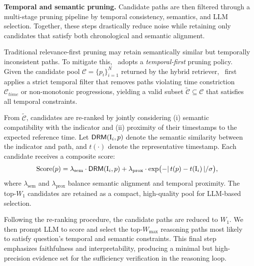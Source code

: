 \noindent
\textbf{Temporal and semantic pruning.}
Candidate paths are then filtered through a multi-stage pruning pipeline by temporal consistency, semantics, and LLM selection.
Together, these steps drastically reduce noise while retaining only candidates that satisfy both chronological and semantic alignment.

Traditional relevance-first pruning may retain semantically similar but temporally inconsistent paths.  
To mitigate this, \mot\ adopts a \emph{temporal-first} pruning policy.  
Given the candidate pool $\mathcal{C} = \{p_i\}_{i=1}^{N}$ returned by the hybrid retriever,  
\mot\ first applies a strict temporal filter that removes paths violating time constriction $\mathcal{C}_{time}$ or non-monotonic progressions,  
yielding a valid subset $\widetilde{\mathcal{C}} \subseteq \mathcal{C}$ that satisfies all temporal constraints.  

From $\widetilde{\mathcal{C}}$, candidates are re-ranked by jointly considering (i) semantic compatibility with the indicator and (ii) proximity of their timestamps to the expected reference time.  
Let $\textsf{DRM}(\mathrm{I}_i,p)$ denote the semantic similarity between the indicator and path, 
and $t(\cdot)$ denote the representative timestamp.  
Each candidate receives a composite score:
\[
\text{Score}(p)
= \lambda_{\text{sem}}\cdot \textsf{DRM}(\mathrm{I}_i,p)
+ \lambda_{\text{prox}}\cdot \exp \bigl(-|\,t(p)-t(\mathrm{I}_i)\,|/\sigma\bigr),
\]
where $\lambda_{\text{sem}}$ and $\lambda_{\text{prox}}$ balance semantic alignment and temporal proximity.  
The top-$W_1$ candidates are retained as a compact, high-quality pool
for LLM-based selection.

Following the re-ranking procedure, the candidate paths are reduced to $W_1$. We then prompt LLM to score and select the top-$W_{\max}$ reasoning paths most likely to satisfy question’s temporal and semantic constraints. 
This final step emphasizes faithfulness and interpretability, producing a minimal but high-precision evidence set for the sufficiency verification in the reasoning loop.



